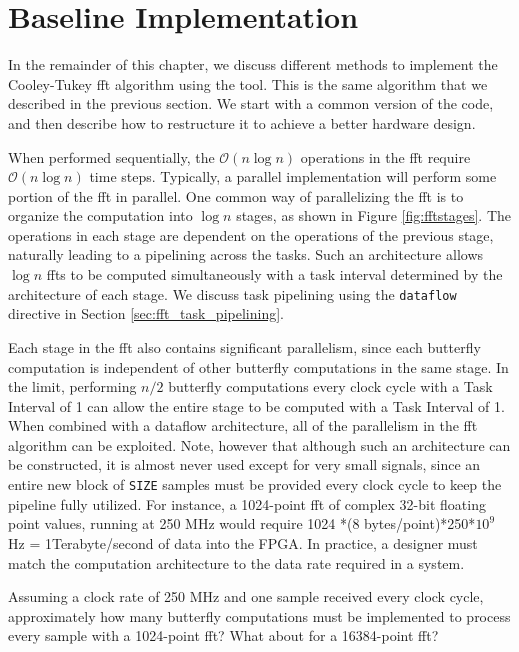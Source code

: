 \section{Baseline Implementation}

In the remainder of this chapter, we discuss different methods to implement the Cooley-Tukey \gls{fft} \cite{cooley65} algorithm using the \VHLS tool. This is the same algorithm that we described in the previous section. We start with a common version of the code, and then describe how to restructure it to achieve a better hardware design. 

When performed sequentially, the $\mathcal{O}(n \log n)$ operations in the \gls{fft} require $\mathcal{O}(n \log n)$ time steps.   Typically, a parallel implementation will perform some portion of the \gls{fft} in parallel.  One common way of parallelizing the \gls{fft} is to organize the computation into $\log n$ stages, as shown in Figure \ref{fig:fftstages}.  The operations in each stage are dependent on the operations of the previous stage, naturally leading to a pipelining across the tasks.  Such an architecture allows $\log n$ \glspl{fft} to be computed simultaneously with a task interval determined by the architecture of each stage.  We discuss task pipelining using the \lstinline|dataflow| directive in Section \ref{sec:fft_task_pipelining}.

Each stage in the \gls{fft} also contains significant parallelism, since each butterfly computation is independent of other butterfly computations in the same stage.  In the limit, performing $n/2$ butterfly computations every clock cycle with a Task Interval of 1 can allow the entire stage to be computed with a Task Interval of 1.  When combined with a dataflow architecture, all of the parallelism in the \gls{fft} algorithm can be exploited.  Note, however that although such an architecture can be constructed, it is almost never used except for very small signals, since an entire new block of \lstinline|SIZE| samples must be provided every clock cycle to keep the pipeline fully utilized.  For instance, a 1024-point \gls{fft} of complex 32-bit floating point values, running at 250 MHz would require 1024 *(8 {bytes}/{point})*250*$10^9$ Hz = 1Terabyte/second of data into the FPGA.   In practice, a designer must match the computation architecture to the data rate required in a system.

\begin{exercise}
Assuming a clock rate of 250 MHz and one sample received every clock cycle, approximately how many butterfly computations must be implemented to process every sample with a 1024-point \gls{fft}?  What about for a 16384-point \gls{fft}?
\end{exercise}

